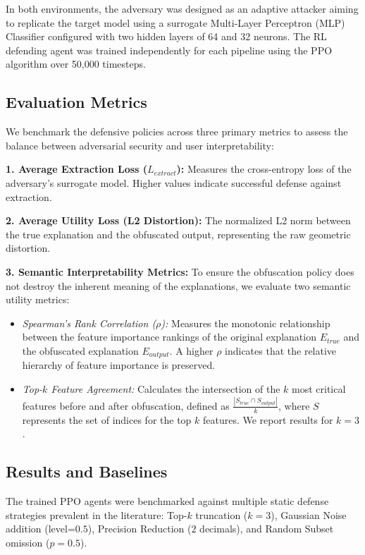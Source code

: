 \documentclass[conference]{IEEEtran}
\begin{document}
In both environments, the adversary was designed as an adaptive attacker aiming to replicate the target model using a surrogate Multi-Layer Perceptron (MLP) Classifier configured with two hidden layers of 64 and 32 neurons. The RL defending agent was trained independently for each pipeline using the PPO algorithm over 50,000 timesteps.

\subsection{Evaluation Metrics}
We benchmark the defensive policies across three primary metrics to assess the balance between adversarial security and user interpretability:

\textbf{1. Average Extraction Loss ($L_{extract}$):} Measures the cross-entropy loss of the adversary's surrogate model. Higher values indicate successful defense against extraction.

\textbf{2. Average Utility Loss (L2 Distortion):} The normalized L2 norm between the true explanation and the obfuscated output, representing the raw geometric distortion.

\textbf{3. Semantic Interpretability Metrics:} To ensure the obfuscation policy does not destroy the inherent meaning of the explanations, we evaluate two semantic utility metrics:
\begin{itemize}
    \item \textit{Spearman's Rank Correlation ($\rho$):} Measures the monotonic relationship between the feature importance rankings of the original explanation $E_{true}$ and the obfuscated explanation $E_{output}$. A higher $\rho$ indicates that the relative hierarchy of feature importance is preserved.
    \item \textit{Top-$k$ Feature Agreement:} Calculates the intersection of the $k$ most critical features before and after obfuscation, defined as $\frac{|S_{true} \cap S_{output}|}{k}$, where $S$ represents the set of indices for the top $k$ features. We report results for $k=3$.
\end{itemize}

\subsection{Results and Baselines}
The trained PPO agents were benchmarked against multiple static defense strategies prevalent in the literature: Top-$k$ truncation ($k=3$), Gaussian Noise addition (level=$0.5$), Precision Reduction ($2$ decimals), and Random Subset omission ($p=0.5$). 
\end{document}
